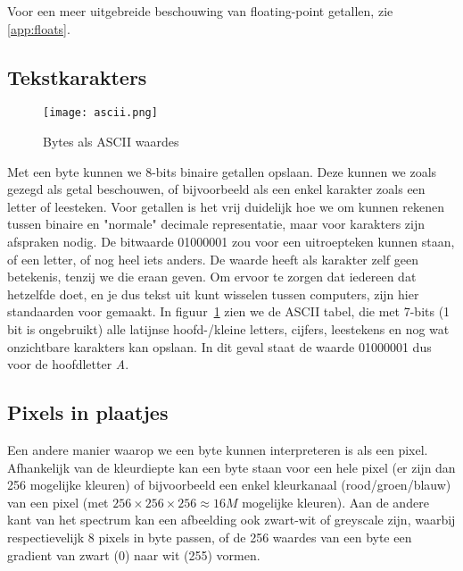 
Voor een meer uitgebreide beschouwing van floating-point getallen, zie \ref{app:floats}.

\subsection{Tekstkarakters}

\begin{figure}[ht]
    \centering
    \texttt{[image: ascii.png]}
    \caption{Bytes als ASCII waardes}
    \label{fig:ascii}
\end{figure}

Met een byte kunnen we 8-bits binaire getallen opslaan. Deze kunnen we zoals gezegd als getal beschouwen, of bijvoorbeeld als een enkel karakter zoals een letter of leesteken. Voor getallen is het vrij duidelijk hoe we om kunnen rekenen tussen binaire en "normale" decimale representatie, maar voor karakters zijn afspraken nodig. De bitwaarde 01000001 zou voor een uitroepteken kunnen staan, of een letter, of nog heel iets anders. De waarde heeft als karakter zelf geen betekenis, tenzij we die eraan geven. Om ervoor te zorgen dat iedereen dat hetzelfde doet, en je dus tekst uit kunt wisselen tussen computers, zijn hier standaarden voor gemaakt. In figuur~\ref{fig:ascii} zien we de ASCII tabel, die met 7-bits (1 bit is ongebruikt) alle latijnse hoofd-/kleine letters, cijfers, leestekens en nog wat onzichtbare karakters kan opslaan. In dit geval staat de waarde 01000001 dus voor de hoofdletter \emph{A}.

\subsection{Pixels in plaatjes}
Een andere manier waarop we een byte kunnen interpreteren is als een pixel. Afhankelijk van de kleurdiepte kan een byte staan voor een hele pixel (er zijn dan 256 mogelijke kleuren) of bijvoorbeeld een enkel kleurkanaal (rood/groen/blauw) van een pixel (met $256 \times 256 \times 256 \approx 16M$ mogelijke kleuren). Aan de andere kant van het spectrum kan een afbeelding ook zwart-wit of greyscale zijn, waarbij respectievelijk 8 pixels in byte passen, of de 256 waardes van een byte een gradient van zwart (0) naar wit (255) vormen.

